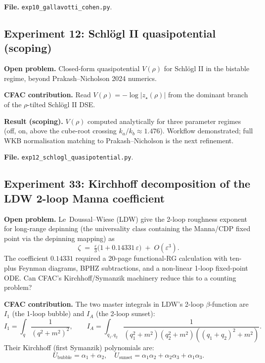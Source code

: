 \documentclass[11pt,a4paper]{article}
\theoremstyle{plain}
\begin{document}
\textbf{File.}  \texttt{exp10\_gallavotti\_cohen.py}.

\subsection*{Experiment 12: Schl\"ogl II quasipotential (scoping)}

\textbf{Open problem.}  Closed-form quasipotential $V(\rho)$ for Schl\"ogl
II in the bistable regime, beyond Prakash--Nicholson 2024 numerics.

\textbf{CFAC contribution.}  Read $V(\rho) = -\log|z_{\star}(\rho)|$ from
the dominant branch of the $\rho$-tilted Schl\"ogl II DSE.

\textbf{Result (scoping).}  $V(\rho)$ computed analytically for three
parameter regimes (off, on, above the cube-root crossing
$k_{a}/k_{b}\approx 1.476$).  Workflow demonstrated; full WKB
normalisation matching to Prakash--Nicholson is the next refinement.

\textbf{File.}  \texttt{exp12\_schlogl\_quasipotential.py}.

\subsection*{Experiment 33: Kirchhoff decomposition of the LDW 2-loop Manna
coefficient}
\label{exp:ldw_kirchhoff}

\textbf{Open problem.}
Le~Doussal--Wiese (LDW) \citep{LeDoussal2002} give the 2-loop
roughness exponent for long-range depinning (the universality class
containing the Manna/CDP fixed point via the depinning mapping) as
\[
  \zeta \;=\; \tfrac{\varepsilon}{3}\bigl(1 + 0.14331\,\varepsilon\bigr)
  \;+\; O(\varepsilon^{3}).
\]
The coefficient $0.14331$ required a 20-page functional-RG calculation
with ten-plus Feynman diagrams, BPHZ subtractions, and a non-linear
1-loop fixed-point ODE.  Can CFAC's Kirchhoff/Symanzik machinery reduce
this to a counting problem?

\textbf{CFAC contribution.}
The two master integrals in LDW's 2-loop
$\beta$-function are $I_1$ (the 1-loop bubble) and $I_A$ (the 2-loop
sunset):
\[
  I_1 = \int_q \frac{1}{(q^2+m^2)^2}, \qquad
  I_A = \int_{q_1,q_2} \frac{1}{(q_1^2+m^2)(q_2^2+m^2)((q_1{+}q_2)^2+m^2)}.
\]
Their Kirchhoff (first Symanzik) polynomials are:
\[
  U_{\text{bubble}} = \alpha_1 + \alpha_2,\quad
  U_{\text{sunset}} = \alpha_1\alpha_2 + \alpha_2\alpha_3 + \alpha_1\alpha_3.
\]
\end{document}
